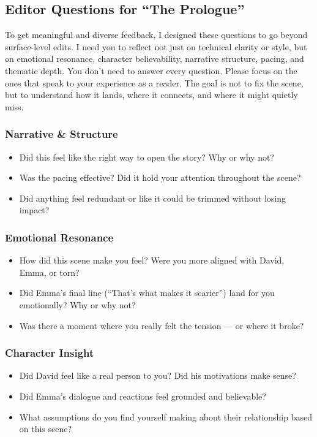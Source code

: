 \subsection{Editor Questions for ``The Prologue''}

To get meaningful and diverse feedback, I designed these questions to go beyond surface-level edits. 
I need you to reflect not just on technical clarity or style, but on emotional resonance, character 
believability, narrative structure, pacing, and thematic depth. You don’t need to answer every question. 
Please focus on the ones that speak to your experience as a reader. The goal is not to fix the scene, but 
to understand how it lands, where it connects, and where it might quietly miss.


\subsubsection{Narrative \& Structure}

\begin{itemize}
  \item Did this feel like the right way to open the story? Why or why not?
  \item Was the pacing effective? Did it hold your attention throughout the scene?
  \item Did anything feel redundant or like it could be trimmed without losing impact?
\end{itemize}

\subsubsection{Emotional Resonance}

\begin{itemize}
  \item How did this scene make you feel? Were you more aligned with David, Emma, or torn?
  \item Did Emma’s final line (“That’s what makes it scarier”) land for you emotionally? Why or why not?
  \item Was there a moment where you really felt the tension — or where it broke?
\end{itemize}

\subsubsection{Character Insight}

\begin{itemize}
  \item Did David feel like a real person to you? Did his motivations make sense?
  \item Did Emma’s dialogue and reactions feel grounded and believable?
  \item What assumptions do you find yourself making about their relationship based on this scene?
\end{itemize}

